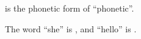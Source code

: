 \documentclass{article}
\begin{document}
 is the phonetic form of ``phonetic''.

The word ``she'' is \textipa{[\textesh i:]}, and ``hello'' is .
\end{document}
